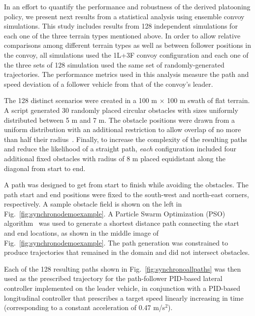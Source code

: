 \documentclass[12pt,twocolumn]{article}
\begin{document}
\begin{table}
\begin{tabular} { cccc }
    \end{tabular}
\end{table}

In an effort to quantify the performance and robustness of the derived platooning policy, we present next results from a statistical analysis using ensemble convoy simulations. This study includes results from 128 independent simulations for each one of the three terrain types mentioned above. In order to allow relative comparisons among different terrain types as well as between follower positions in the convoy, all simulations used the 1L+3F convoy configuration and each one of the three sets of 128 simulation used the same set of randomly-generated trajectories. The performance metrics used in this analysis measure the path and speed deviation of a follower vehicle from that of the convoy's leader.


The 128 distinct scenarios were created in a 100 m $\times$ 100 m swath of flat terrain. A script generated 30 randomly placed circular obstacles with sizes uniformly distributed between 5 m and 7 m. The obstacle positions were drawn from a uniform distribution with an additional restriction to allow overlap of no more than half their radius~\cite{MATLABBubbleBath}. Finally, to increase the complexity of the resulting paths and reduce the likelihood of a straight path, \textit{each} configuration included four additional fixed obstacles with radius of 8 m placed equidistant along the diagonal from start to end.

A path was designed to get from start to finish while avoiding the obstacles. 
The path start and end positions were fixed to the south-west and north-east corners, respectively. A sample obstacle field is shown on the left in Fig.~\ref{fig:synchronodemoexample}.
A Particle Swarm Optimization (PSO) algorithm~\cite{PSOObstacleAvoidance} was used to generate a shortest distance path connecting the start and end locations, as shown in the middle image of Fig.~\ref{fig:synchronodemoexample}. The path generation was constrained to produce trajectories that remained in the domain and did not intersect obstacles.

Each of the 128 resulting paths shown in Fig.~\ref{fig:synchronoallpaths} was then used as the prescribed trajectory for the path-follower PID-based lateral controller implemented on the leader vehicle, in conjunction with a PID-based longitudinal controller that prescribes a target speed linearly increasing in time (corresponding to a constant acceleration of 0.47 m/s$^2$).
\end{document}
